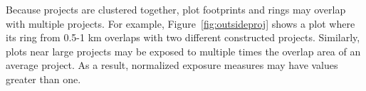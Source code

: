 \documentclass[12pt]{article}
\newcommand{\rv}{}
\begin{document}

\rv{Because projects are clustered together, plot footprints and rings may overlap with multiple projects.  For example, Figure~\ref{fig:outsideproj} shows a plot where its ring from 0.5-1 km overlaps with two different constructed projects.  Similarly, plots near large projects may be exposed to multiple times the overlap area of an average project.  As a result, normalized exposure measures may have values greater than one.}




 


\end{document}
